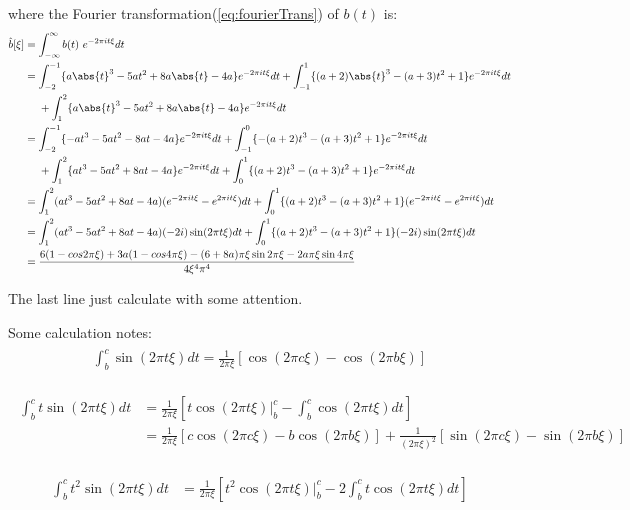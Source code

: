 \documentclass[12pt]{article}
\numberwithin{equation}{section}
\begin{document}
where the Fourier transformation(\ref{eq:fourierTrans}) of $b(t)$ is:
\begin{align}\begin{split}
	\hat{b}[\xi] &=  \int_{-\infty}^{\infty} b(t)\ e^{-2\pi i t \xi} dt \\
	&=  \int_{-2}^{-1}\{a\abs{t}^3-5at^2+8a\abs{t}-4a \}e^{-2\pi i t \xi} dt  + \int_{-1}^{1}\{(a+2)\abs{t}^3-(a+3)t^2+1\} e^{-2\pi i t \xi}dt \\
	&\ \ \ \ + \int_{1}^{2}\{a\abs{t}^3-5at^2+8a\abs{t}-4a \}e^{-2\pi i t \xi} dt \\
	&=  \int_{-2}^{-1}\{-at^3-5at^2-8at-4a \}e^{-2\pi i t \xi} dt  + \int_{-1}^{0}\{-(a+2)t^3-(a+3)t^2+1\} e^{-2\pi i t \xi}dt \\
	&\ \ \ \ + \int_{1}^{2}\{at^3-5at^2+8at-4a \}e^{-2\pi i t \xi} dt   + \int_{0}^{1}\{(a+2)t^3-(a+3)t^2+1\} e^{-2\pi i t \xi}dt \\
	&= \int_{1}^{2}(at^3-5at^2+8at-4a )(e^{-2\pi i t \xi}-e^{2\pi i t \xi})dt  + \int_{0}^{1}\{(a+2)t^3-(a+3)t^2+1\} (e^{-2\pi i t \xi}-e^{2\pi i t \xi})dt\\
	&= \int_{1}^{2}(at^3-5at^2+8at-4a )(-2i)\sin(2\pi t \xi)dt  + \int_{0}^{1}\{(a+2)t^3-(a+3)t^2+1\}(-2i)\sin(2\pi t \xi)dt\\
	&= \frac{6(1-cos2\pi \xi)+3a(1-cos4\pi \xi) - (6+8a) \pi \xi \sin 2 \pi \xi - 2a \pi \xi \sin 4\pi \xi}{4\xi^4\pi^4}
\end{split}\end{align} \par
The last line just calculate with some attention. \par
Some calculation notes: 
\begin{align}\begin{split}
	\int_{b}^{c} \sin(2\pi t \xi)dt = \frac{1}{2\pi \xi} [\cos(2\pi c \xi) - \cos(2\pi b \xi)]
\end{split}\end{align} \par
\begin{align}\begin{split}
	\int_{b}^{c}t \sin(2\pi t \xi)dt &= \frac{1}{2\pi \xi} [t\cos(2\pi t \xi)|_b^c-\int_{b}^{c} \cos(2\pi t \xi)dt] \\
	&= \frac{1}{2\pi \xi}[c\cos(2\pi c \xi)-b\cos(2\pi b \xi)]+\frac{1}{(2\pi \xi)^2}[\sin(2\pi c \xi)-\sin(2\pi b \xi)]
\end{split}\end{align} \par
\begin{align}\begin{split}
	\int_{b}^{c}t^2 \sin(2\pi t \xi)dt &= \frac{1}{2\pi \xi} [t^2\cos(2\pi t \xi)|_b^c-2\int_{b}^{c} t\cos(2\pi t \xi)dt] \\
\end{split}\end{align} \par
\end{document}
